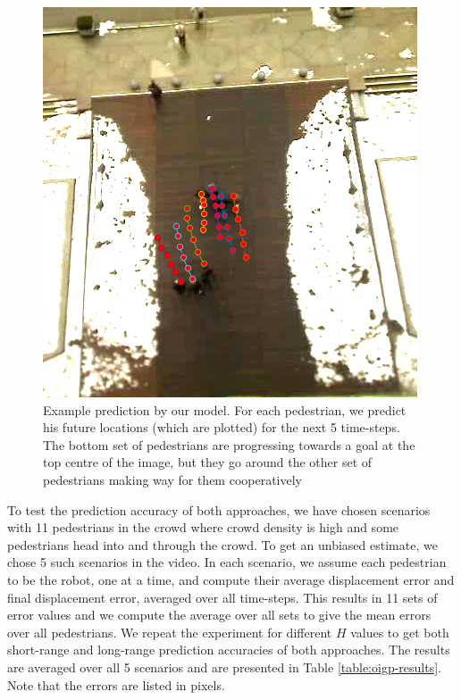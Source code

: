 \begin{figure}[t!]
  \centering
  \includegraphics[width=0.7\linewidth]{Figures/igp2-crop.png}
  \caption{Example prediction by our model. For each pedestrian, we predict his future locations (which are plotted) for the next 5 time-steps. The bottom set of pedestrians are progressing towards a goal at the top centre of the image, but they go around the other set of pedestrians making way for them cooperatively}
  \label{fig:oigp-bestcase}
\end{figure}

To test the prediction accuracy of both approaches, we have chosen scenarios with 11 pedestrians in the crowd where crowd density is high and some pedestrians head into and through the crowd. To get an unbiased estimate, we chose 5 such scenarios in the video. In each scenario, we assume each pedestrian to be the robot, one at a time, and compute their average displacement error and final displacement error, averaged over all time-steps. This results in 11 sets of error values and we compute the average over all sets to give the mean errors over all pedestrians. We repeat the experiment for different $H$ values to get both short-range and long-range prediction accuracies of both approaches. The results are averaged over all 5 scenarios and are presented in Table \ref{table:oigp-results}. Note that the errors are listed in pixels.

